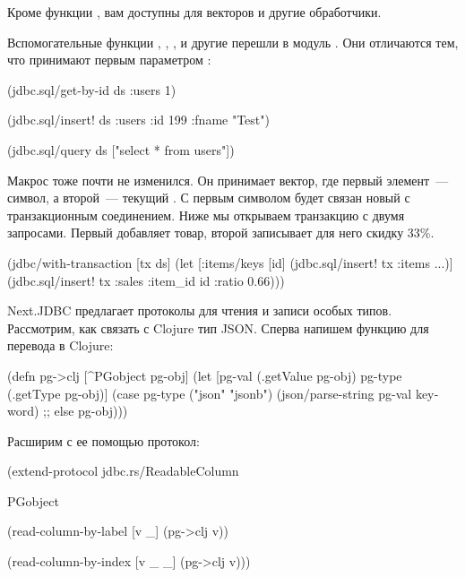 Кроме функции , вам доступны  для векторов и другие обработчики.

Вспомогательные функции , , ,  и другие перешли в модуль . Они отличаются тем, что принимают первым параметром :

\begin{english}
  \begin{clojure}
(jdbc.sql/get-by-id ds :users 1)

(jdbc.sql/insert! ds :users {:id 199 :fname "Test"})

(jdbc.sql/query ds ["select * from users"])
  \end{clojure}
\end{english}

Макрос  тоже почти не изменился. Он принимает вектор, где первый элемент~--- символ, а второй~--- текущий . С первым символом будет связан новый  с транзакционным соединением. Ниже мы открываем транзакцию с двумя запросами. Первый добавляет товар, второй записывает для него скидку 33\%.

\begin{english}
  \begin{clojure}
(jdbc/with-transaction
  [tx ds]
  (let [{:items/keys [id]}
        (jdbc.sql/insert! tx :items {...})]
    (jdbc.sql/insert!
       tx
       :sales
       {:item_id id :ratio 0.66})))
  \end{clojure}
\end{english}

Next.JDBC предлагает протоколы для чтения и записи особых типов. Рассмотрим, как связать с Clojure тип JSON. Сперва напишем функцию для перевода  в Clojure:

\begin{english}
  \begin{clojure}
(defn pg->clj
  [^PGobject pg-obj]
  (let [pg-val (.getValue pg-obj)
        pg-type (.getType pg-obj)]
    (case pg-type
      ("json" "jsonb")
      (json/parse-string pg-val keyword)
      ;; else
      pg-obj)))
  \end{clojure}
\end{english}

Расширим с ее помощью протокол:

\begin{english}
  \begin{clojure}
(extend-protocol jdbc.rs/ReadableColumn

  PGobject

  (read-column-by-label [v _]
    (pg->clj v))

  (read-column-by-index [v _ _]
    (pg->clj v)))
  \end{clojure}
\end{english}

